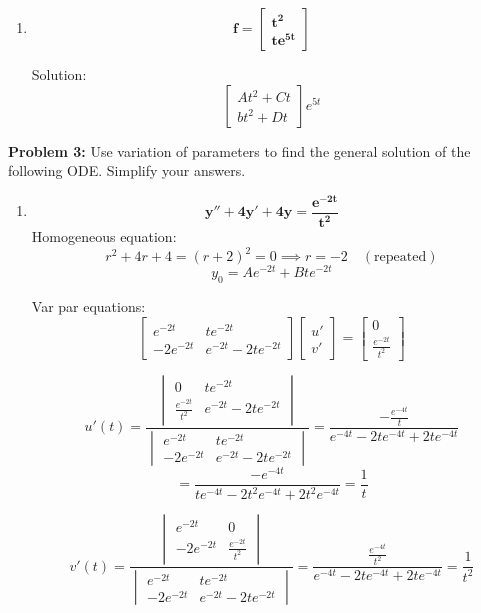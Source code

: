 \documentclass[12pt]{article}
\begin{document}
\begin{enumerate}
    \item \[\mathbf{f = \begin{bmatrix}
        t^2\\
        te^{5t}
    \end{bmatrix}}\]

    Solution:
    \[\begin{bmatrix}
        At^2 + Ct\\
        bt^2 + Dt
    \end{bmatrix}e^{5t}\]
\end{enumerate}

\pagebreak 

\textbf{Problem 3:} Use variation of parameters to find the general solution of the following ODE. Simplify your answers.
\begin{enumerate}
    \item \[\mathbf{y'' + 4y' + 4y = \frac{e^{-2t}}{t^2}}\]
    Homogeneous equation: 
    \[r^2 + 4r + 4 = (r + 2)^2 = 0 \implies r = -2 \quad (\text{repeated})\]
    \[y_0 = Ae^{-2t} + Bte^{-2t}\]

    Var par equations:
    \[\begin{bmatrix}
        e^{-2t} & te^{-2t}\\
        -2e^{-2t} & e^{-2t} -2te^{-2t}
    \end{bmatrix} \begin{bmatrix}
        u'\\
        v'
    \end{bmatrix} = \begin{bmatrix}
        0\\
        \frac{e^{-2t}}{t^2}
    \end{bmatrix}\] 

    \[u'(t) = \frac{\begin{vmatrix}
       0 & te^{-2t}\\
       \frac{e^{-2t}}{t^2} & e^{-2t} -2te^{-2t}
    \end{vmatrix}}{\begin{vmatrix}
        e^{-2t} & te^{-2t}\\
        -2e^{-2t} & e^{-2t} -2te^{-2t}
    \end{vmatrix}} = \frac{-\frac{e^{-4t}}{t}}{e^{-4t} -2te^{-4t} + 2te^{-4t}}\]
    \[= \frac{-e^{-4t}}{te^{-4t} -2t^2e^{-4t} + 2t^2e^{-4t}} = \frac{1}{t}\]

    \[v'(t) = \frac{\begin{vmatrix}
        e^{-2t} & 0\\
         -2e^{-2t} & \frac{e^{-2t}}{t^2} 
     \end{vmatrix}}{\begin{vmatrix}
         e^{-2t} & te^{-2t}\\
         -2e^{-2t} & e^{-2t} -2te^{-2t} \end{vmatrix}} 
    = \frac{\frac{e^{-4t} }{t^2}}{e^{-4t} -2te^{-4t} + 2te^{-4t}} = \frac{1}{t^2}\]      
         

\end{enumerate}
\end{document}

